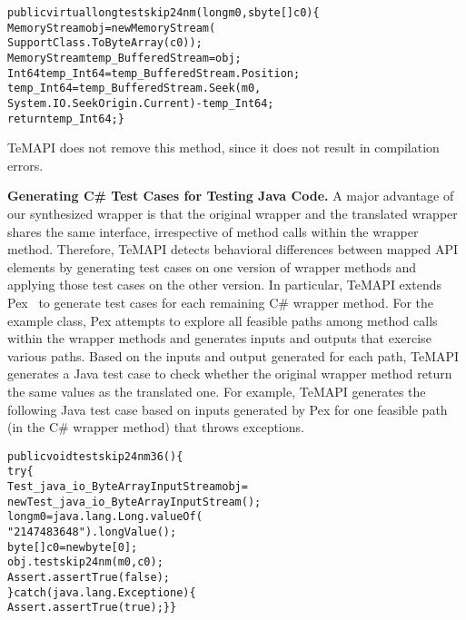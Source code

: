 \begin{CodeOut}\vspace*{-1.5ex}
\begin{alltt}
public virtual long testskip24nm(long m0, sbyte[] c0)\{
  MemoryStream obj = new MemoryStream(
                    SupportClass.ToByteArray(c0));
  MemoryStream temp_BufferedStream = obj;
  Int64 temp_Int64 = temp_BufferedStream.Position;
  temp_Int64 = temp_BufferedStream.Seek(m0,
       System.IO.SeekOrigin.Current) - temp_Int64;
  return temp_Int64;\}
\end{alltt}
\end{CodeOut}\vspace*{-2ex}

TeMAPI does not remove this method, since it does not result in compilation errors.


\textbf{Generating C\# Test Cases for Testing Java Code.} A major advantage of our synthesized wrapper is that the original wrapper and the translated wrapper shares the same interface, irrespective of method calls within the wrapper method. Therefore, TeMAPI detects behavioral differences between mapped API elements by generating test cases on one version of wrapper methods and applying those test cases on the other version. In particular, TeMAPI extends Pex~\cite{tillmann2008pex} to generate test cases for each remaining C\# wrapper method. For the example class, Pex attempts to explore all feasible paths among method calls within the wrapper methods and generates inputs and outputs that exercise various paths. Based on the inputs and output generated for each path, TeMAPI generates a Java test case to check whether the original wrapper method return the same values as the translated one. For example, TeMAPI generates the following Java test case based on inputs generated by Pex for one feasible path (in the C\# wrapper method) that throws exceptions.

\begin{CodeOut}\vspace*{-1.5ex}
\begin{alltt}
public void testskip24nm36()\{
  try\{
     Test_java_io_ByteArrayInputStream obj =
        new Test_java_io_ByteArrayInputStream();
     long m0 = java.lang.Long.valueOf(
                  "2147483648").longValue();
     byte[] c0 = new byte[0];
     obj.testskip24nm(m0,c0);
     Assert.assertTrue(false);
  \}catch(java.lang.Exception e)\{
     Assert.assertTrue(true); \}\}
\end{alltt}
\end{CodeOut}\vspace*{-2ex}

